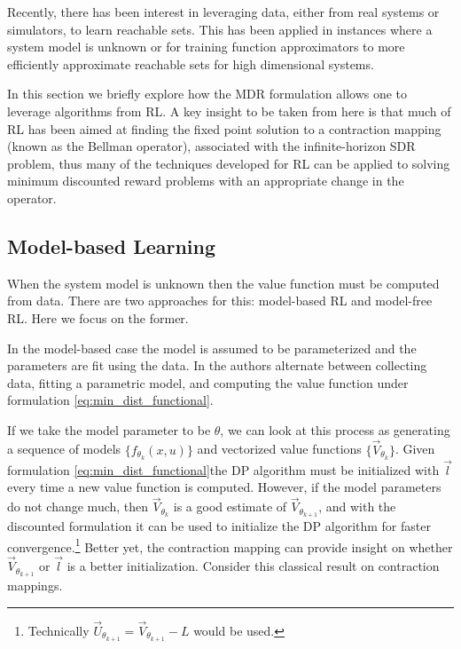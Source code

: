 
Recently, there has been interest in leveraging data, either from real systems or simulators, to learn reachable sets. This has been applied in instances where a system model is unknown or for training function approximators to more efficiently approximate reachable sets for high dimensional systems. 

In this section we briefly explore how the MDR formulation allows one to leverage algorithms from RL. A key insight to be taken from here is that much of RL has been aimed at finding the fixed point solution to a contraction mapping (known as the Bellman operator), associated with the infinite-horizon SDR problem, thus many of the techniques developed for RL can be applied to solving minimum discounted reward problems with an appropriate change in the operator.

\subsection{Model-based Learning}

When the system model is unknown then the value function must be computed from data. There are two approaches for this: model-based RL and model-free RL. Here we focus on the former. 

In the model-based case the model is assumed to be parameterized and the parameters are fit using the data. In \cite{Akametalu2014,Gillula2012a} the authors alternate between collecting data, fitting a parametric model, and computing the value function under formulation \eqref{eq:min_dist_functional}.

If we take the model parameter to be $\theta$, we can look at this process as generating a sequence of models $\{f_{\theta_k}(x,u)\}$ and vectorized value functions $\{\vec{V}_{\theta_k}\}$. Given formulation \eqref{eq:min_dist_functional}the DP algorithm must be initialized with $\vec{l}$ every time a new value function is computed. However, if the model parameters do not change much, then $\vec{V}_{\theta_k}$ is a good estimate of $\vec{V}_{\theta_{k+1}}$, and with the discounted formulation it can be used to initialize the DP algorithm for faster convergence.\footnote{Technically $\vec{U}_{\theta_{k+1}}= \vec{V}_{\theta_{k+1}}-L$ would be used.} Better yet, the contraction mapping can provide insight on whether $\vec{V}_{\theta_{k+1}}$ or $\vec{l}$ is a better initialization. Consider this classical result on contraction mappings. 

